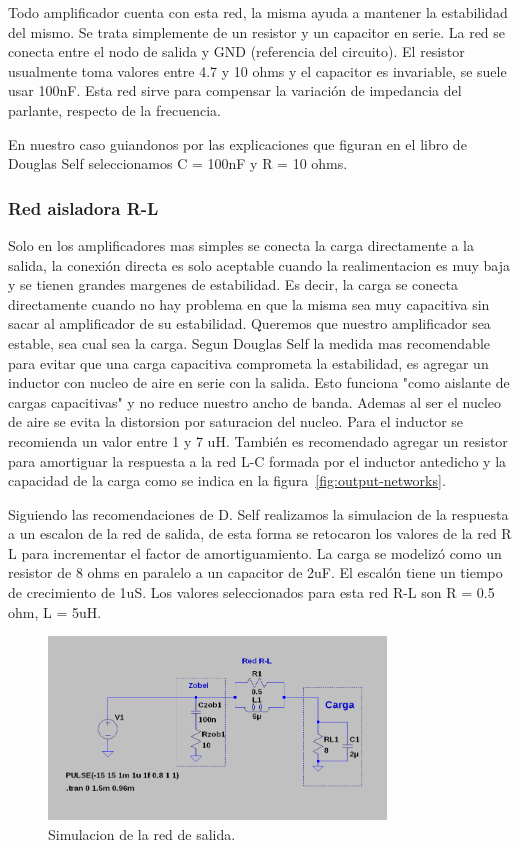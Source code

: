 \documentclass[a4paper,12pt,twoside]{article}
\begin{document}
Todo amplificador cuenta con esta red, la misma ayuda a mantener la estabilidad del mismo. Se trata simplemente de un resistor y un capacitor
en serie. La red se conecta entre el nodo de salida y GND (referencia del circuito).
El resistor usualmente toma valores entre 4.7 y 10 ohms y el capacitor es invariable, se suele usar 100nF.
Esta red sirve para compensar la variación de impedancia del parlante, respecto de la frecuencia. 

En nuestro caso guiandonos por las explicaciones que figuran en el libro de Douglas Self seleccionamos C = 100nF y R = 10 ohms. 

\subsubsection{Red aisladora R-L}

Solo en los amplificadores mas simples se conecta la carga directamente a la salida, la conexión directa es solo aceptable 
cuando la realimentacion es muy baja y se tienen grandes margenes de estabilidad.
Es decir, la carga se conecta directamente cuando no hay problema en que la misma sea muy capacitiva sin sacar al
amplificador de su estabilidad.
Queremos que nuestro amplificador sea estable, sea cual sea la carga.
Segun Douglas Self la medida mas recomendable para evitar que una carga capacitiva comprometa la estabilidad, es agregar un inductor con nucleo
de aire en serie con la salida. Esto funciona "como aislante de cargas capacitivas" y no reduce nuestro ancho de banda. Ademas al ser el nucleo de
aire se evita la distorsion por saturacion del nucleo.
Para el inductor se recomienda un valor entre 1 y 7 uH.
También es recomendado agregar un resistor para amortiguar la respuesta a la red L-C formada por el inductor antedicho y la capacidad de la carga como se indica en la figura~\ref{fig:output-networks}.

Siguiendo las recomendaciones de D. Self realizamos la simulacion de la respuesta a un escalon de la red de salida, de esta forma se retocaron los 
valores de la red R L para incrementar el factor de amortiguamiento. 
La carga se modelizó como un resistor de 8 ohms en paralelo a un capacitor de 2uF. El escalón tiene un tiempo de crecimiento de 1uS.
Los valores seleccionados para esta red  R-L son R = 0.5 ohm, L = 5uH.

\begin{figure}[H]
\centering
\includegraphics[width=0.8\textwidth]{img/simulacion_zobel}
\caption{Simulacion de la red de salida.}
\label{fig:sim_red_salidas} 
\end{figure}
\end{document}
